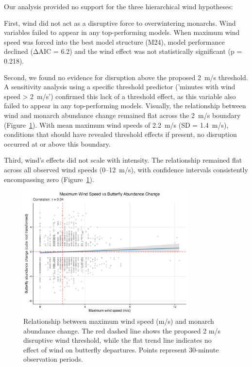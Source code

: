 Our analysis provided no support for the three hierarchical wind hypotheses:

First, wind did not act as a disruptive force to overwintering monarchs. Wind variables failed to appear in any top-performing models. When maximum wind speed was forced into the best model structure (M24), model performance declined (ΔAIC = 6.2) and the wind effect was not statistically significant (p = 0.218).

Second, we found no evidence for disruption above the proposed 2~m/s threshold. A sensitivity analysis using a specific threshold predictor ('minutes with wind speed > 2~m/s') confirmed this lack of a threshold effect, as this variable also failed to appear in any top-performing models. Visually, the relationship between wind and monarch abundance change remained flat across the 2~m/s boundary (Figure~\ref{fig:wind_scatter}). With mean maximum wind speeds of 2.2~m/s (SD = 1.4~m/s), conditions that should have revealed threshold effects if present, no disruption occurred at or above this boundary.

Third, wind's effects did not scale with intensity. The relationship remained flat across all observed wind speeds (0–12~m/s), with confidence intervals consistently encompassing zero (Figure~\ref{fig:wind_scatter}).

\begin{figure}[htbp]
\centering
\includegraphics[width=0.8\textwidth]{supplemental/results/thesis_exports/figures/wind_hypothesis_scatter.png}
\caption{Relationship between maximum wind speed (m/s) and monarch abundance change. The red dashed line shows the proposed 2 m/s disruptive wind threshold, while the flat trend line indicates no effect of wind on butterfly departures. Points represent 30-minute observation periods.}\label{fig:wind_scatter}
\end{figure}

